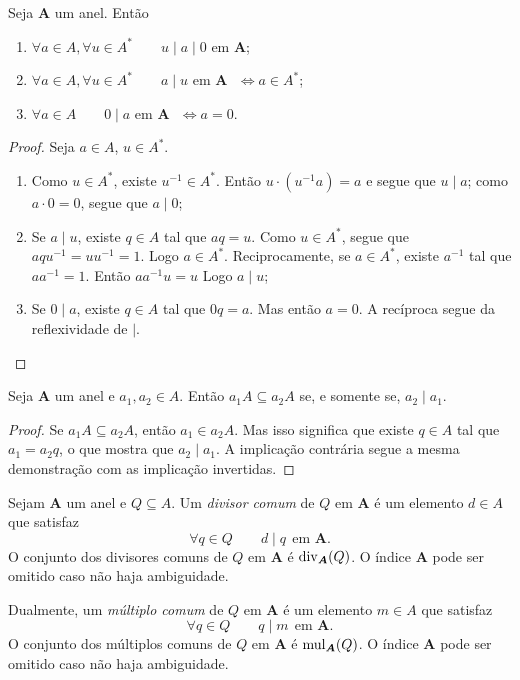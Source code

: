 \begin{prop}
	Seja $\bm A$ um anel. Então
	\begin{enumerate}
	\item $\forall a \in A,\forall u \in A^* \qquad u \mid a \mid 0$ em $\bm A$;
	\item $\forall a \in A,\forall u \in A^* \qquad a \mid u \text{\ \ em $\bm A$\ \ } \Leftrightarrow a \in A^*$;
	\item $\forall a \in A \qquad 0 \mid a \text{\ \ em $\bm A$\ \ } \Leftrightarrow a=0$.
	\end{enumerate}
\end{prop}
\begin{proof} Seja $a \in A$, $u \in A^*$.
	\begin{enumerate}
	\item Como $u \in A^*$, existe $u^{-1} \in A^*$. Então $u\cdot(u^{-1}a) = a$ e segue que $u \mid a$; como $a \cdot 0 = 0$, segue que $a \mid 0$;
	\item Se $a \mid u$, existe $q \in A$ tal que $aq=u$. Como $u \in A^*$, segue que $aqu^{-1}=uu^{-1}=1$. Logo $a \in A^*$. Reciprocamente, se $a \in A^*$, existe $a^{-1}$ tal que $aa^{-1}=1$. Então $aa^{-1}u=u$ Logo $a \mid u$;
	\item Se $0 \mid a$, existe $q \in A$ tal que $0q=a$. Mas então $a=0$. A recíproca segue da reflexividade de $\mid$.
	\end{enumerate}
\end{proof}

\begin{prop}
	Seja $\bm A$ um anel e $a_1,a_2 \in A$. Então $a_1A \subseteq a_2A$ se, e somente se, $a_2 \mid a_1$.
\end{prop}
\begin{proof}
	Se $a_1A \subseteq a_2A$, então $a_1 \in a_2A$. Mas isso significa que existe $q \in A$ tal que $a_1=a_2q$, o que mostra que $a_2 \mid a_1$. A implicação contrária segue a mesma demonstração com as implicação invertidas.
\end{proof}

\begin{defi}
	Sejam $\bm A$ um anel e $Q \subseteq A$. Um \emph{divisor comum} de $Q$ em $\bm A$ é um elemento $d \in A$ que satisfaz
	\begin{equation*}
	\forall q \in Q \qquad d \mid q \ \ \text{em $\bm A$}.
	\end{equation*}
O conjunto dos divisores comuns de $Q$ em $\bm A$ é $\operatorname{div}_{\bm A}(Q)$. O índice $\bm A$ pode ser omitido caso não haja ambiguidade.

Dualmente, um \emph{múltiplo comum} de $Q$ em $\bm A$ é um elemento $m \in A$ que satisfaz
	\begin{equation*}
	\forall q \in Q \qquad q \mid m \ \ \text{em $\bm A$}.
	\end{equation*}
O conjunto dos múltiplos comuns de $Q$ em $\bm A$ é $\operatorname{mul}_{\bm A}(Q)$. O índice $\bm A$ pode ser omitido caso não haja ambiguidade.
\end{defi}

